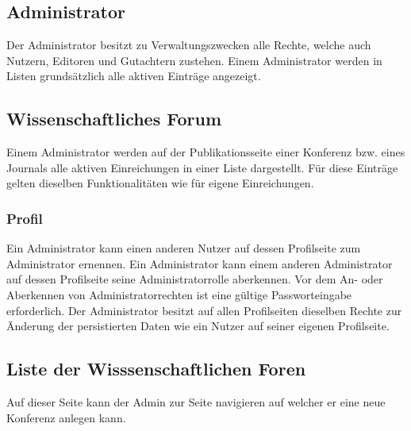 \subsection{Administrator}
Der Administrator besitzt zu Verwaltungszwecken alle Rechte, welche auch Nutzern, Editoren
und Gutachtern zustehen. %
Einem Administrator werden in Listen grundsätzlich alle aktiven Einträge angezeigt.

\subsection{Wissenschaftliches Forum}
\begin{description}
    \XXitem{} Einem Administrator werden auf der Publikationsseite einer Konferenz bzw. eines Journals
    alle aktiven Einreichungen in einer Liste dargestellt.
    Für diese Einträge gelten dieselben Funktionalitäten wie für eigene Einreichungen. %
\end{description}

\subsubsection{Profil}
\begin{description}
    \XXitem{} Ein Administrator kann einen anderen Nutzer auf dessen Profilseite zum Administrator ernennen.
    \XXitem{} Ein Administrator kann einem anderen Administrator auf dessen Profilseite seine
    Administratorrolle aberkennen.
     Vor dem An- oder Aberkennen von Administratorrechten ist eine gültige
    Passworteingabe erforderlich.
    \XXitem{} Der Administrator besitzt auf allen Profilseiten dieselben Rechte zur Änderung
    der persistierten Daten wie ein Nutzer auf seiner eigenen Profilseite. %
\end{description}

\subsection{Liste der Wisssenschaftlichen Foren}
\begin{description}
    \XXitem{} Auf dieser Seite kann der Admin zur Seite navigieren auf welcher er eine neue
    Konferenz anlegen kann. %
\end{description}

